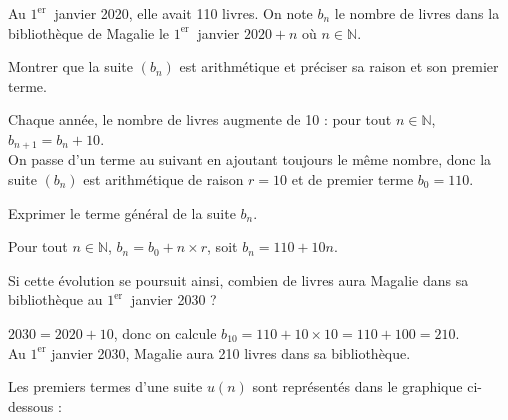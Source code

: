 \documentclass[11pt,a4paper]{article}  %
\begin{document}
Au $1^{\text {er }}$ janvier 2020, elle avait 110 livres.
On note $b_n$ le nombre de livres dans la bibliothèque de Magalie le $1^{\text {er }}$ janvier $2020+n$ où $n \in \mathbb{N}$.
\begin{enumMet}
	\item Montrer que la suite $\left(b_n\right)$ est arithmétique et préciser sa raison et son premier terme.
	\par
	\begin{corrBox}
		Chaque année, le nombre de livres augmente de 10 : pour tout $n\in\mathbb{N}$, $b_{n+1}=b_n+10$.\\
		On passe d'un terme au suivant en ajoutant toujours le même nombre, donc la suite $\left(b_n\right)$ est arithmétique de raison $r=10$ et de premier terme $b_0=110$.
	\end{corrBox}

	\item Exprimer le terme général de la suite $b_n$.
	\par
	\begin{corrBox}
		Pour tout $n\in\mathbb{N}$, $b_n=b_0+n\times r$, soit $b_n=110+10n$.
	\end{corrBox}

	\item Si cette évolution se poursuit ainsi, combien de livres aura Magalie dans sa bibliothèque au $1^{\text {er }}$ janvier 2030 ?
	\par
	\begin{corrBox}
		$2030=2020+10$, donc on calcule $b_{10}=110+10\times 10=110+100=210$.\\
		Au $1^{\text{er}}$ janvier 2030, Magalie aura 210 livres dans sa bibliothèque.
	\end{corrBox}
\end{enumMet}


Les premiers termes d'une suite $u(n)$ sont représentés dans le graphique ci-dessous :

\begin{center}
\end{center}
\end{document}
